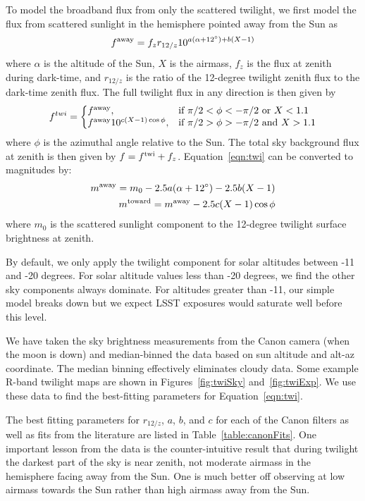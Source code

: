 \documentclass[]{spie}
\begin{document}
To model the broadband flux from only the scattered twilight, we first model the flux from scattered sunlight in the hemisphere pointed away from the Sun as
\begin{equation}\label{eqn:twi1}
  f^{\rm{away}} = f_{z} r_{12/z} 10^{a(\alpha+12^{\circ})+b(X-1)}
\end{equation}
where $\alpha$ is the altitude of the Sun, $X$ is the airmass, $f_{z}$ is the flux at zenith during dark-time, and $r_{12/z}$ is the ratio of the 12-degree twilight zenith flux to the dark-time zenith flux. The full twilight flux in any direction is then given by
\begin{equation}
  \label{eqn:twi}
  f^{twi}  = \left\{
  \begin{array}{@{}ll@{}}
        f^{\rm{away}}, & \text{if}\  \pi/2 < \phi < -\pi/2  \text{ or } X < 1.1\\
        f^{\rm{away}} 10^{c (X-1) \cos{\phi}}, &  \text{if}\   \pi/2 > \phi >  -\pi/2 \text{ and } X > 1.1
        \end{array} \right.
\end{equation}
where $\phi$ is the azimuthal angle relative to the Sun. The total sky background flux at zenith is then given by $f = f^{\rm{twi}} + f_{z}$. Equation~\ref{eqn:twi} can be converted to magnitudes by:
\begin{eqnarray}
  m^{\rm{away}} = m_0 -2.5a(\alpha+12^{\circ})-2.5b(X-1) \\
  m^{\rm{toward}} = m^{\rm{away}} -2.5c(X-1)\cos{\phi}
\end{eqnarray}
where $m_0$ is the scattered sunlight component to the 12-degree twilight surface brightness at zenith.  

By default, we only apply the twilight component for solar altitudes between -11 and -20 degrees. For solar altitude values less than -20 degrees, we find the other sky components always dominate. For altitudes greater than -11, our simple model breaks down but we expect LSST exposures would saturate well before this level.  

We have taken the sky brightness measurements from the Canon camera (when the moon is down) and median-binned the data based on sun altitude and alt-az coordinate.  The median binning effectively eliminates cloudy data.  Some example R-band twilight maps are shown in Figures~\ref{fig:twiSky} and~\ref{fig:twiExp}.  We use these data to find the best-fitting parameters for Equation~\ref{eqn:twi}.  

The best fitting parameters for $r_{12/z}$, $a$, $b$, and $c$ for each of the Canon filters as well as fits from the literature are listed in Table~\ref{table:canonFits}.  One important lesson from the data is the counter-intuitive result that during twilight the darkest part of the sky is near zenith, not moderate airmass in the hemisphere facing away from the Sun. One is much better off observing at low airmass towards the Sun rather than high airmass away from the Sun.
\end{document}
